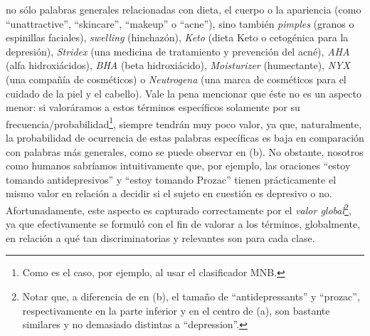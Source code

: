 no sólo palabras generales relacionadas con dieta, el cuerpo o la apariencia (como ``unattractive'', ``skincare'', ``makeup'' o ``acne''), sino también \emph{pimples} (granos o espinillas faciales), \emph{swelling} (hinchazón), \emph{Keto} (dieta Keto o cetogénica para la depresión), \emph{Stridex} (una medicina de tratamiento y prevención del acné), \emph{AHA} (alfa hidroxiácidos), \emph{BHA} (beta hidroxiácido), \emph{Moisturizer} (humectante), \emph{NYX} (una compañía de cosméticos) o \emph{Neutrogena} (una marca de cosméticos para el cuidado de la piel y el cabello).
Vale la pena mencionar que éste no es un aspecto menor: si valoráramos a estos términos específicos solamente por su frecuencia/probabilidad\footnote{Como es el caso, por ejemplo, al usar el clasificador \ac{MNB}.}, siempre tendrán muy poco valor, ya que, naturalmente, la probabilidad de ocurrencia de estas palabras específicas es baja en comparación con palabras más generales, como se puede observar en (b). No obstante, nosotros como humanos sabríamos intuitivamente que, por ejemplo, las oraciones ``estoy tomando antidepresivos''  y ``estoy tomando Prozac'' tienen prácticamente el mismo valor en relación a decidir si el sujeto en cuestión es depresivo o no. Afortunadamente, este aspecto es capturado correctamente por el \emph{valor global}\footnote{Notar que, a diferencia de en (b), el tamaño de ``antidepressants'' y ``prozac'', respectivamente en la parte inferior y en el centro de (a), son bastante similares y no demasiado distintas a ``depression''.}, ya que efectivamente se formuló con el fin de valorar a los términos, globalmente, en relación a qué tan discriminatorias y relevantes son para cada clase.
